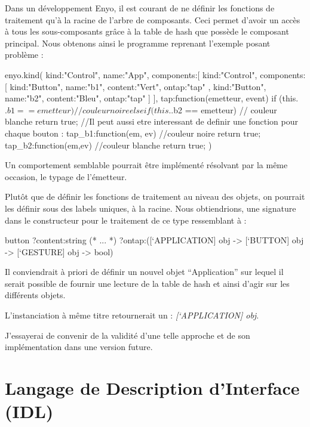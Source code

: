 \documentclass[11pt,a4paper]{report}
\begin{document}
Dans un développement Enyo, il est courant de ne définir les fonctions de traitement qu'à la racine de l'arbre
de composants. Ceci permet d'avoir un accès à tous les sous-composants grâce à la table de hash que possède
le composant principal. Nous obtenons ainsi le programme reprenant l'exemple posant problème :
\begin{JavaScript}
  enyo.kind({
    kind:"Control",
    name:"App",
    components:[
      {
        kind:"Control",
        components:[
          {kind:"Button", name:"b1", content:"Vert",
            ontap:"tap"
          },
          {kind:"Button", name:"b2", content:"Bleu",         
            ontap:"tap"
          }
        ]
      }
    ],
    tap:function(emetteur, event){
      if (this.$.b1 == emetteur){
        // couleur noire
      } else if (this.$.b2 == emetteur){
        // couleur blanche 
      }
      return true;
    }
    //Il peut aussi etre interessant de definir une fonction pour chaque bouton :
    tap_b1:function(em, ev){ 
      //couleur noire
      return true;
    }
    tap_b2:function(em,ev){
      //couleur blanche
      return true;
    }
})
\end{JavaScript}

Un comportement semblable pourrait être implémenté résolvant par la même occasion, le typage de l'émetteur.

Plutôt que de définir les fonctions de traitement au niveau des objets, on pourrait les définir
sous des labels uniques, à la racine. Nous obtiendrions, une signature dans le constructeur
pour le traitement de ce type ressemblant à :
\begin{OCaml}
  button ?content:string
         (* ... *)
         ?ontap:([`APPLICATION] obj -> 
                 [`BUTTON] obj -> 
                 [`GESTURE] obj -> bool)
\end{OCaml}

Il conviendrait à priori de définir un nouvel objet ``Application'' sur lequel il serait possible de
fournir une lecture de la table de hash et ainsi d'agir sur les différents objets.

L'instanciation à même titre retournerait un : \emph{[`APPLICATION] obj}.

J'essayerai de convenir de la validité d'une telle approche et de son implémentation dans une 
version future.


\chapter{Langage de Description d'Interface (IDL)}\label{chap:idl}
\end{document}
